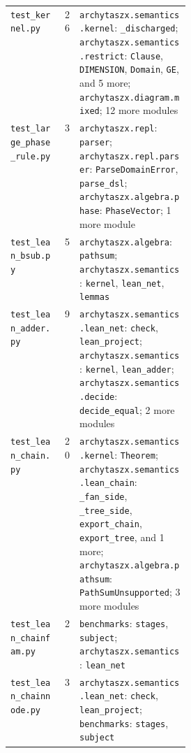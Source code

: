 \begin{xltabular}{\linewidth}{@{}>{\raggedright\arraybackslash}p{0.3\linewidth}r>{\raggedright\arraybackslash}X@{}}
\texttt{test\_\allowbreak{}kernel.py} & 26 & \texttt{archytaszx.\allowbreak{}semantics.\allowbreak{}kernel}: \texttt{\_\allowbreak{}discharged}; \texttt{archytaszx.\allowbreak{}semantics.\allowbreak{}restrict}: \texttt{Clause}, \texttt{DIMENSION}, \texttt{Domain}, \texttt{GE}, and 5 more; \texttt{archytaszx.\allowbreak{}diagram.\allowbreak{}mixed}; 12 more modules \\
\texttt{test\_\allowbreak{}large\_\allowbreak{}phase\_\allowbreak{}rule.py} & 3 & \texttt{archytaszx.\allowbreak{}repl}: \texttt{parser}; \texttt{archytaszx.\allowbreak{}repl.\allowbreak{}parser}: \texttt{ParseDomainError}, \texttt{parse\_\allowbreak{}dsl}; \texttt{archytaszx.\allowbreak{}algebra.\allowbreak{}phase}: \texttt{PhaseVector}; 1 more module \\
\texttt{test\_\allowbreak{}lean\_\allowbreak{}bsub.py} & 5 & \texttt{archytaszx.\allowbreak{}algebra}: \texttt{pathsum}; \texttt{archytaszx.\allowbreak{}semantics}: \texttt{kernel}, \texttt{lean\_\allowbreak{}net}, \texttt{lemmas} \\
\texttt{test\_\allowbreak{}lean\_\allowbreak{}adder.py} & 9 & \texttt{archytaszx.\allowbreak{}semantics.\allowbreak{}lean\_\allowbreak{}net}: \texttt{check}, \texttt{lean\_\allowbreak{}project}; \texttt{archytaszx.\allowbreak{}semantics}: \texttt{kernel}, \texttt{lean\_\allowbreak{}adder}; \texttt{archytaszx.\allowbreak{}semantics.\allowbreak{}decide}: \texttt{decide\_\allowbreak{}equal}; 2 more modules \\
\texttt{test\_\allowbreak{}lean\_\allowbreak{}chain.py} & 20 & \texttt{archytaszx.\allowbreak{}semantics.\allowbreak{}kernel}: \texttt{Theorem}; \texttt{archytaszx.\allowbreak{}semantics.\allowbreak{}lean\_\allowbreak{}chain}: \texttt{\_\allowbreak{}fan\_\allowbreak{}side}, \texttt{\_\allowbreak{}tree\_\allowbreak{}side}, \texttt{export\_\allowbreak{}chain}, \texttt{export\_\allowbreak{}tree}, and 1 more; \texttt{archytaszx.\allowbreak{}algebra.\allowbreak{}pathsum}: \texttt{PathSumUnsupported}; 3 more modules \\
\texttt{test\_\allowbreak{}lean\_\allowbreak{}chainfam.py} & 2 & \texttt{benchmarks}: \texttt{stages}, \texttt{subject}; \texttt{archytaszx.\allowbreak{}semantics}: \texttt{lean\_\allowbreak{}net} \\
\texttt{test\_\allowbreak{}lean\_\allowbreak{}chainnode.py} & 3 & \texttt{archytaszx.\allowbreak{}semantics.\allowbreak{}lean\_\allowbreak{}net}: \texttt{check}, \texttt{lean\_\allowbreak{}project}; \texttt{benchmarks}: \texttt{stages}, \texttt{subject} \\

\end{xltabular}
